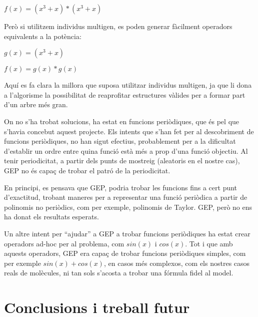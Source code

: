 \begin{center}
	$f(x) = (x^3 + x) * (x^3 + x) $
\end{center}


Però si utilitzem individus multigen, es poden generar fàcilment operadors equivalents a la
potència:

\begin{center}
	$g(x) = (x^3 + x)$

	$f(x) = g(x) * g(x)$
\end{center}

Aquí es fa clara la millora que suposa utilitzar individus multigen, ja que li
dona a l'algorisme la possibilitat de reaprofitar estructures vàlides per a
formar part d'un arbre més gran.

On no s'ha trobat solucions, ha estat en funcions periòdiques, que és pel que
s'havia concebut aquest projecte.  Els intents que s'han fet per al descobriment
de funcions periòdiques, no han sigut efectius, probablement per a la dificultat
d'establir un ordre entre quina funció està més a prop d'una funció objectiu.
Al tenir periodicitat, a partir dels punts de mostreig (aleatoris en el nostre
cas), GEP no és capaç de trobar el patró de la periodicitat.

En principi, es pensava que GEP, podria trobar les funcions fins a cert punt
d'exactitud, trobant maneres per a representar una funció periòdica a partir de
polinomis no periòdics, com per exemple, polinomis de Taylor. GEP, però no ens
ha donat els resultats esperats.

Un altre intent per ``ajudar'' a GEP a trobar funcions periòdiques ha estat
crear operadors ad-hoc per al problema, com $sin(x)$ i $cos(x)$.  Tot i que amb
aquests operadors, GEP era capaç de trobar funcions periòdiques simples, com per
exemple $sin(x)+cos(x)$, en casos més complexos, com els nostres casos reals de
molècules, ni tan sols s'acosta a trobar una fórmula fidel al model.

\section{Conclusions i treball futur} %
\label{sec:GConclusions i treball futur}

%
